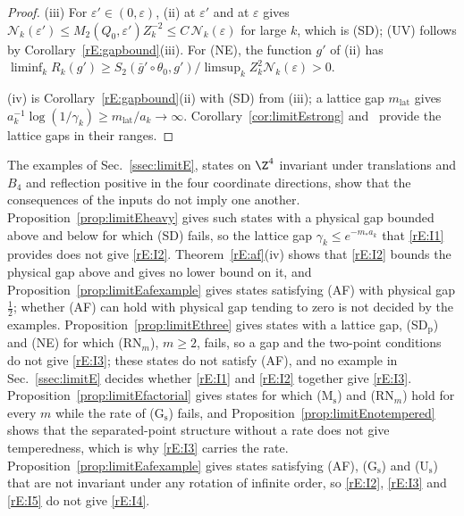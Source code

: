 \begin{proof}
(iii) For $\varepsilon'\in(0,\varepsilon)$, (ii) at $\varepsilon'$ and at
$\varepsilon$ gives $\mathcal N_k(\varepsilon')\le M_2(Q_0,\varepsilon')
Z_k^{-2}\le C\,\mathcal N_k(\varepsilon)$ for large $k$, which is (SD);
(UV) follows by Corollary~\ref{rE:gapbound}(iii). For (NE), the function
$g'$ of (ii) has $\liminf_kR_k(g')\ge S_2(\bar g'\circ\theta_0,g')/
\limsup_kZ_k^2\mathcal N_k(\varepsilon)>0$.

(iv) is Corollary~\ref{rE:gapbound}(ii) with (SD) from (iii); a lattice gap
$m_{\mathrm{lat}}$ gives $a_k^{-1}\log(1/\gamma_k)\ge m_{\mathrm{lat}}/a_k\to
\infty$. Corollary~\ref{cor:limitEstrong} and~\cite[Corollary~322]{BBLR26}
provide the lattice gaps in their ranges.
\end{proof}

\begin{remark}\label{rE:independent}
The examples of Sec.~\ref{ssec:limitE}, states on $\Z^4$ invariant under
translations and $B_4$ and reflection positive in the four coordinate
directions, show that the consequences of the inputs do not imply one
another. Proposition~\ref{prop:limitEheavy} gives such states with a
physical gap bounded above and below for which (SD) fails, so the lattice
gap $\gamma_k\le e^{-m_*a_k}$ that \ref{rE:I1} provides does not give
\ref{rE:I2}. Theorem~\ref{rE:af}(iv) shows that \ref{rE:I2} bounds the
physical gap above and gives no lower bound on it, and
Proposition~\ref{prop:limitEafexample} gives states satisfying (AF) with
physical gap $\frac12$; whether (AF) can hold with physical gap tending to
zero is not decided by the examples. Proposition~\ref{prop:limitEthree}
gives states with a lattice gap, (SD$_{\mathrm p}$) and (NE) for which
(RN$_m$), $m\ge2$, fails, so a gap and the two-point conditions do not give
\ref{rE:I3}; these states do not satisfy (AF), and no example in
Sec.~\ref{ssec:limitE} decides whether \ref{rE:I1} and \ref{rE:I2} together
give \ref{rE:I3}. Proposition~\ref{prop:limitEfactorial} gives states for
which (M$_{\mathrm s}$) and (RN$_m$) hold for every $m$ while the rate of
(G$_{\mathrm s}$) fails, and Proposition~\ref{prop:limitEnotempered} shows
that the separated-point structure without a rate does not give
temperedness, which is why \ref{rE:I3} carries the rate.
Proposition~\ref{prop:limitEafexample} gives states satisfying (AF),
(G$_{\mathrm s}$) and (U$_{\mathrm s}$) that are not invariant under any
rotation of infinite order, so \ref{rE:I2}, \ref{rE:I3} and \ref{rE:I5} do
not give \ref{rE:I4}.
\end{remark}

